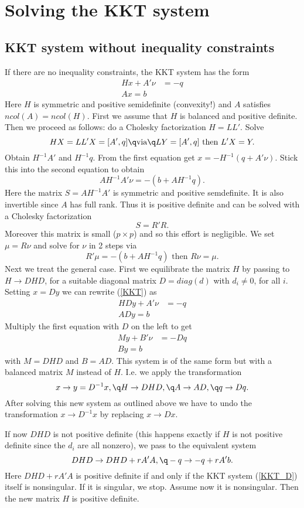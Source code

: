 \section{Solving the KKT system}

\subsection{KKT system without inequality constraints}

If there are no inequality constraints, the KKT system has the form
%
\begin{align}
\label{KKT}
Hx+A'\nu&=-q\\
Ax=b
\end{align}
%
Here $H$ is symmetric and positive semidefinite (convexity!) and $A$ satisfies
$ncol(A)=ncol(H)$. First we assume that $H$ is balanced and positive definite.
Then we proceed as follows: do a Cholesky factorization $H=LL'$.
Solve
$$
HX=LL'X=[A',q]\q\text{via}\q LY=[A',q]\text{ then }L'X=Y.
$$
Obtain $H^{-1}A'$ and $H^{-1}q$. From the first equation get
$x=-H^{-1}(q+A'\nu)$. Stick this into the second equation to obtain
$$
AH^{-1}A'\nu=-(b+AH^{-1}q).
$$
Here the matrix $S=AH^{-1}A'$ is symmetric and positive semdefinite.
It is also invertible since $A$ has full rank. Thus it is positive definite
and can be solved with a Cholesky factorization
$$
S=R'R.
$$
Moreover this matrix is small ($p\times p$) and so this effort is negligible.
We set $\mu=R\nu$ and solve for $\nu$ in 2 steps via
$$
R'\mu=-(b+AH^{-1}q)\text{ then }R\nu=\mu.
$$
Next we treat the general case. First we equilibrate the matrix $H$ by passing to
$H\rightarrow DHD$, for a suitable diagonal matrix $D=diag(d)$ with $d_i\neq 0$,
for all $i$. Setting $x=Dy$ we can rewrite
(\ref{KKT}) as
%
\begin{align*}
HDy+A'\nu&=-q\\
ADy=b
\end{align*}
%
Multiply the first equation with $D$ on the left to get
%
\begin{align}
\label{KKT_D}
My+B'\nu&=-Dq\\
By=b
\end{align}
%
with $M=DHD$ and $B=AD$. This system is of the same form but with a balanced
matrix $M$ instead of $H$. I.e. we apply the transformation
%
\begin{equation}
\label{D_transform}
x\rightarrow y=D^{-1}x,\q H\rightarrow DHD,\q A\rightarrow AD,\q
q\rightarrow Dq.
\end{equation}
%
After solving this new system as outlined above we have to undo the
transformation $x\rightarrow D^{-1}x$ by replacing $x\rightarrow Dx$.

If now $DHD$ is not positive definite (this happens exactly if $H$ is not positive
definite since the $d_i$ are all nonzero), we pass to the equivalent system
%
\begin{equation}
\label{H_transform}
DHD\rightarrow DHD+rA'A,\q
-q\rightarrow -q+rA'b.
\end{equation}
%
Here $DHD+rA'A$ is positive definite if and only if the KKT system (\ref{KKT_D}) itself
is nonsingular. If it is singular, we stop. Assume now it is nonsingular.
Then the new matrix $H$ is positive definite.

